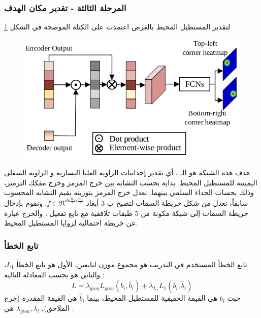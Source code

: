  \subsubsection{المرحلة الثالثة - تقدير مكان الهدف }
لتقدير المستطيل المحيط  بالغرض اعتمدت 
على الكتلة الموضحة في الشكل 
\ref{stark_score_head}
\begin{figure}[!h]
	\centerline{\includegraphics[scale=0.5]{images/stark_score_head}}
	\caption{
		}
	\label{stark_score_head}
\end{figure}
هدف هذه الشبكة هو الـ
، أي تقدير إحداثيات  الزاوية العليا اليسارية و الزاوية السفلى اليمينية للمستطيل المحيط.
بداية يحسب التشابه بين خرج المرمز وخرج مفكك الترميز،
 وذلك بحساب الجداء السلمي بينهما. نعدل خرج المرمز بتوزينه بقيم التشابه المحسوب سابقاً، نعدل من شكل خريطة السمات لتصبح ب
 $3$
  أبعاد 
$f \in \Re^{d \mathsf{x} \frac{H_s}{s} \mathsf{x} \frac{W_s}{s}}$.
ونقوم بإدخال خريطة السمات إلى شبكة 
 مكونة من $ 5$ طبقات تلاففية
 مع تابع تفعيل 
.
والخرج عبارة عن خريطة احتمالية لزوايا المستطيل المحيط.
\subsubsection{تابع الخطأ}
تابع الخطأ المستخدم في التدريب هو مجموع موزن لتابعين، الأول هو تابع الخطأ 
$L_1$،
والثاني هو
بحسب المعادلة التالية :
\begin{equation}
L = \lambda_{giou} L_{giou}(b_i,\hat{b}_i) + \lambda_{L_1} L_1(b_i,\hat{b}_i)
\label{loss_regression}
\end{equation} 
حيث 
$b_i$
هي القيمة الحقيقية 
للمستطيل المحيط، بينما
$\hat{b}_i$
هي القيمة المقدرة (خرج الملاحق)، 
$\lambda_{giou},\lambda_l$
هي
.
